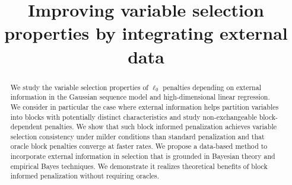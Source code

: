 \documentclass[aos]{imsart}
\theoremstyle{plain}
\begin{document}
\begin{frontmatter}
\title{Improving variable selection properties by integrating external data}


\begin{abstract}
We study the variable selection properties of $\ell_0$ penalties depending on external information in the Gaussian sequence model and high-dimensional linear regression. We consider in particular the case where external information helps partition variables into blocks
with potentially distinct characteristics and study non-exchangeable block-dependent penalties. We show that such block informed penalization achieves variable selection consistency under milder conditions than standard penalization and that oracle block penalties converge at faster rates. We propose a data-based method to incorporate external information in selection that is grounded in Bayesian theory and empirical Bayes techniques. We demonstrate it realizes theoretical benefits of block informed penalization without requiring oracles.  
\end{abstract}

\begin{keyword}[class=MSC]
\end{keyword}

\begin{keyword}
\end{keyword}
\end{frontmatter}
\end{document}
